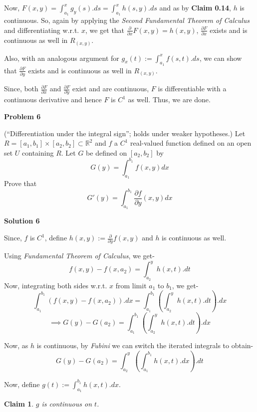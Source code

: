 \documentclass[12pt,a4paper]{article}
\newtheorem{claim}[theorem]{Claim}
\theoremstyle{definition}
\begin{document}
\begin{flushleft}
Now, $F(x,y) = \int_{a_1}^{x} g_y (s).ds = \int_{a_1}^{x} h(s,y).ds$ and as by {\bf Claim 0.14}, $h$ is continuous. So, again by applying the {\it Second Fundamental Theorem of Calculus} and differentiating w.r.t. $x$, we get that $\frac{\partial}{\partial x} F(x,y) = h(x,y)$, $\frac{\partial F}{\partial x}$ exists and is continuous as well in $R_{(x,y)}$.

\medskip

Also, with an analogous argument for $g_x (t) := \int_{a_1}^{x} f(s,t).ds$, we can show that $\frac{\partial F}{\partial y}$ exists and is continuous as well in $R_{(x,y)}$.

\medskip

Since, both $\frac{\partial F}{\partial x}$ and $\frac{\partial F}{\partial y}$ exist and are continuous, $F$ is differentiable with a continuous derivative and hence $F$ is $C^1$ as well. Thus, we are done.

\newpage

{\bf  Problem 6}

(``Differentiation under the integral sign''; holds under weaker hypotheses.) Let $R=[a_1,b_1] \times [a_2,b_2] \subset \mathbb{R}^2$ and $f$ a $C^1$ real-valued function defined on an open set $U$ containing $R$. Let $G$ be defined on $[a_2,b_2]$ by
\[
G(y)=\int_{a_1}^{b_1} f(x,y)dx 
\]
Prove that
\[
G'(y)=\int_{a_1}^{b_1} \frac{\partial f}{\partial y} (x,y)dx 
\]

\bigskip

{\bf Solution 6}

Since, $f$ is $C^1$, define $h(x,y) := \frac{\partial}{\partial y} f(x,y)$ and $h$ is continuous as well.

Using {\it Fundamental Theorem of Calculus}, we get-
$$f(x,y) - f(x,a_2) = \int_{a_2}^{y} h(x,t).dt$$
Now, integrating both sides w.r.t. $x$ from limit $a_1$ to $b_1$, we get-
$$\int_{a_1}^{b_1} (f(x,y) - f(x,a_2)).dx = \int_{a_1}^{b_1} (\int_{a_2}^{y} h(x,t).dt).dx$$
$$\implies G(y) - G(a_2) = \int_{a_1}^{b_1} (\int_{a_2}^{y} h(x,t).dt).dx$$

Now, as $h$ is continuous, by {\it Fubini} we can switch the iterated integrals to obtain-
$$G(y) - G(a_2) = \int_{a_2}^{y} (\int_{a_1}^{b_1} h(x,t).dx).dt$$

\medskip

Now, define $g(t) := \int_{a_1}^{b_1} h(x,t).dx$.

\begin{claim}
	$g$ is continuous on $t$.
\end{claim}


\end{flushleft}
\end{document}
